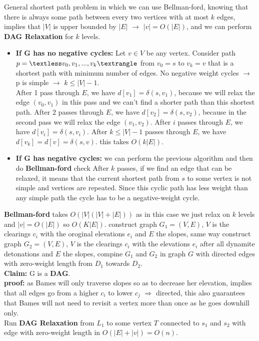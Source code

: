 \documentclass[12pt,twoside]{article}
\begin{document}
\begin{problems}
\newpage
\problem  %
General shortest path problem in which we can use Bellman-ford, knowing that there is always some path between every 
two vertices with at most $k$ edges, implies that $|V|$ is upper bounded by $|E|$ $\rightarrow$ $|v| = O(|E|)$, and 
we can perform \textbf{DAG Relaxation} for $k$ levels. 
\begin{itemize}
  \item \textbf{If G has no negative cycles:} 
    Let $v \in V$ be any vertex. Consider path $p = \textless v_0, v_1, . . . , v_k⟩$ from $v_0 = s$ to $v_k = v$
    that is a shortest path with minimum number of edges. No negative weight cycles $\rightarrow$ p is simple $\rightarrow$
    $k \leq |V| - 1$. \\
    After 1 pass through $E$, we have $d[v_1] = \delta(s, v_1)$, because we will relax the edge $(v_0, v_1)$ in this pass
    and we can’t find a shorter path than this shortest path. 
    After 2 passes through $E$, we have $d[v_2] = \delta(s, v_2)$, 
     because in the second pass we will relax the edge $(v_1, v_2)$.
    After $i$ passes through $E$, we have $d[v_i] = \delta(s, v_i)$.
    After $k \leq |V| - 1$ passes through $E$, we have $d[v_k] = d[v] = \delta(s, v)$. 
    this takes $O(k|E|)$. 
  \item \textbf{If G has negative cycles:} we can perform the previous algorithm and then do \textbf{Bellman-ford} check
    After $k$ passes, if we find an edge that can be relaxed, it means that the current
    shortest path from $s$ to some vertex is not simple and vertices are repeated. Since this
    cyclic path has less weight than any simple path the cycle has to be a negative-weight
    cycle.
\end{itemize}
  \textbf{Bellman-ford} takes $O(|V|(|V| + |E|))$ as in this case we just relax on $k$ levels and $|v| = O(|E|)$ 
  so $O(K|E|)$.
\newpage
\problem  %
  construct graph $G_1 = (V, E)$, $V$ is the clearings $c_i$ with the oroginal elevations $e_i$ and $E$ the slopes, 
  same way construct graph $G_2 = (V, E)$, $V$ is the clearings $c_i$ with the elevations $e_i$ after all dynamite 
  detonations and $E$ the slopes, compine $G_1$ and $G_2$ in graph $G$ with directed edges with zero-weight length from $D_1$ towards $D_2$. \\
  \textbf{Claim:} G is a \textbf{DAG}. \\
  \textbf{proof:} as Bames will only traverse slopes so as to decrease her elevation, implies that all edges go from 
  a higher $c_i$ to lower $c_j$ $\Rightarrow$ directed, this also guarantees that Bames will not need to revisit a vertex 
  more than once as he goes downhill only. \\

  Run \textbf{DAG Relaxation} from $L_1$ to some vertex $T$ connected to $s_1$ and $s_2$ with 
  edge with zero-weight length in $O(|E| + |v|) = O(n)$.
\newpage
\problem  %

\newpage
\problem  %

\newpage
\problem  %

\end{problems}
\end{document}
